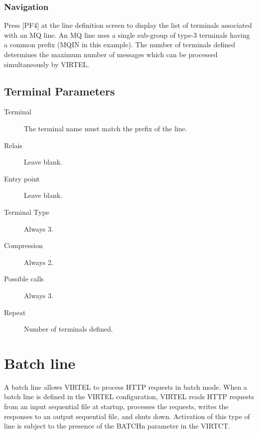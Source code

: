 \documentclass[letterpaper,10pt,english]{sphinxmanual}
\begin{document}
\subsubsection{Navigation}
\label{\detokenize{connectivity_guide:id9}}
Press {[}PF4{]} at the line definition screen to display the list of terminals associated with an MQ line. An MQ line uses a single sub-group of type-3 terminals having a common prefix (MQIN in this example). The number of terminals defined determines the maximum number of messages which can be processed simultaneously by VIRTEL.



\subsection{Terminal Parameters}
\label{\detokenize{connectivity_guide:index-30}}\label{\detokenize{connectivity_guide:terminal-parameters}}\begin{description}
\item[{Terminal}] \leavevmode
The terminal name must match the prefix of the line.

\item[{Relais}] \leavevmode
Leave blank.

\item[{Entry point}] \leavevmode
Leave blank.

\item[{Terminal Type}] \leavevmode
Always 3.

\item[{Compression}] \leavevmode
Always 2.

\item[{Possible calls}] \leavevmode
Always 3.

\item[{Repeat}] \leavevmode
Number of terminals defined.

\end{description}

\newpage


\section{Batch line}
\label{\detokenize{connectivity_guide:index-31}}\label{\detokenize{connectivity_guide:batch-line}}
A batch line allows VIRTEL to process HTTP requests in batch mode. When a batch line is defined in the VIRTEL configuration, VIRTEL reads HTTP requests from an input sequential file at startup, processes the requests, writes the responses to an output sequential file, and shuts down. Activation of this type of line is subject to the presence of the BATCHn parameter in the VIRTCT.
\end{document}
